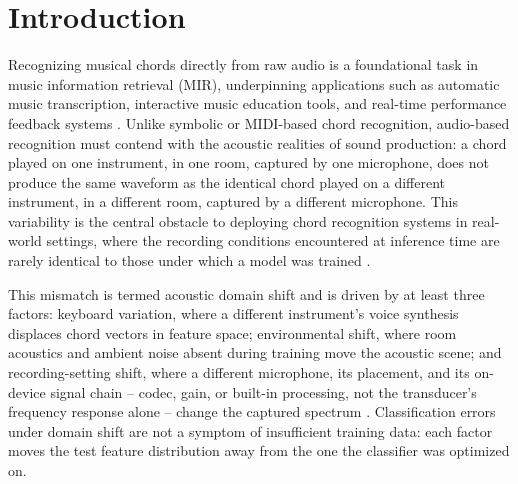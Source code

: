 \documentclass[pdflatex,sn-mathphys-num,iicol]{sn-jnl}
\theoremstyle{thmstyleone}
\theoremstyle{thmstyletwo}
\theoremstyle{thmstylethree}
\begin{document}

\maketitle

\section{Introduction}\label{sec1}

Recognizing musical chords directly from raw audio is a foundational task in music information retrieval (MIR), underpinning applications such as automatic music transcription, interactive music education tools, and real-time performance feedback systems \cite{Telila2023}\cite{Saputra2021}\cite{Moysis2023}. Unlike symbolic or MIDI-based chord recognition, audio-based recognition must contend with the acoustic realities of sound production: a chord played on one instrument, in one room, captured by one microphone, does not produce the same waveform as the identical chord played on a different instrument, in a different room, captured by a different microphone. This variability is the central obstacle to deploying chord recognition systems in real-world settings, where the recording conditions encountered at inference time are rarely identical to those under which a model was trained \cite{Kusaka2024}.

This mismatch is termed acoustic domain shift and is driven by at least three factors: keyboard variation, where a different instrument's voice synthesis displaces chord vectors in feature space; environmental shift, where room acoustics and ambient noise absent during training move the acoustic scene; and recording-setting shift, where a different microphone, its placement, and its on-device signal chain -- codec, gain, or built-in processing, not the transducer's frequency response alone -- change the captured spectrum \cite{Kusaka2024}\cite{Majchrzak2025}. Classification errors under domain shift are not a symptom of insufficient training data: each factor moves the test feature distribution away from the one the classifier was optimized on.
\end{document}
